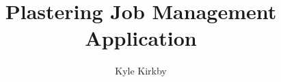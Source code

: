 \documentclass{report}
\begin{document}
\title{Plastering Job Management Application}
\author{Kyle Kirkby}
\maketitle
\tableofcontents






\end{document}
